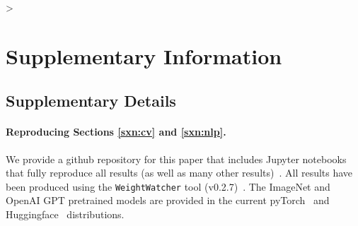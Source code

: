 >%
\section{Supplementary Information}
\label{sxn:appendix}


\subsection{Supplementary Details} 

\paragraph{Reproducing Sections \ref{sxn:cv} and \ref{sxn:nlp}. }   

We provide a github repository for this paper that includes Jupyter notebooks that fully reproduce all results (as well as many other results)~\cite{kdd20_sub_repo}.
All results have been produced using the \texttt{WeightWatcher} tool (v0.2.7)~\cite{weightwatcher_package}.
The ImageNet and OpenAI GPT pretrained models are provided in the current 
pyTorch~\cite{pytorch} and Huggingface~\cite{huggingface} distributions.

